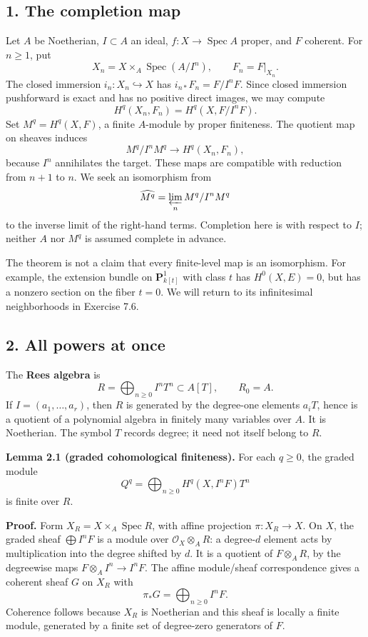 \documentclass[11pt]{article}
\begin{document}
\subsection{1. The completion map}\label{the-completion-map}

Let \(A\) be Noetherian, \(I\subset A\) an ideal,
\(f:X\to\operatorname{Spec}A\) proper, and \(F\) coherent. For
\(n\geq1\), put \[
X_n=X\times_A\operatorname{Spec}(A/I^n),\qquad F_n=F|_{X_n}.
\] The closed immersion \(i_n:X_n\hookrightarrow X\) has
\(i_{n*}F_n=F/I^nF\). Since closed immersion pushforward is exact and
has no positive direct images, we may compute \[
H^q(X_n,F_n)=H^q(X,F/I^nF).
\] Set \(M^q=H^q(X,F)\), a finite \(A\)-module by proper finiteness. The
quotient map on sheaves induces \[
M^q/I^nM^q\longrightarrow H^q(X_n,F_n),
\] because \(I^n\) annihilates the target. These maps are compatible
with reduction from \(n+1\) to \(n\). We seek an isomorphism from \[
\widehat{M^q}=\varprojlim_n M^q/I^nM^q
\] to the inverse limit of the right-hand terms. Completion here is with
respect to \(I\); neither \(A\) nor \(M^q\) is assumed complete in
advance.

The theorem is not a claim that every finite-level map is an
isomorphism. For example, the extension bundle on \(\mathbf P^1_{k[t]}\)
with class \(t\) has \(H^0(X,E)=0\), but has a nonzero section on the
fiber \(t=0\). We will return to its infinitesimal neighborhoods in
Exercise 7.6.

\subsection{2. All powers at once}\label{all-powers-at-once}

The \textbf{Rees algebra} is \[
R=\bigoplus_{n\geq0}I^nT^n\subset A[T],\qquad R_0=A.
\] If \(I=(a_1,\ldots,a_r)\), then \(R\) is generated by the degree-one
elements \(a_iT\), hence is a quotient of a polynomial algebra in
finitely many variables over \(A\). It is Noetherian. The symbol \(T\)
records degree; it need not itself belong to \(R\).

\textbf{Lemma 2.1 (graded cohomological finiteness).} For each
\(q\geq0\), the graded module \[
Q^q=\bigoplus_{n\geq0}H^q(X,I^nF)T^n
\] is finite over \(R\).

\textbf{Proof.} Form \(X_R=X\times_A\operatorname{Spec}R\), with affine
projection \(\pi:X_R\to X\). On \(X\), the graded sheaf
\(\bigoplus I^nF\) is a module over \(\mathcal O_X\otimes_A R\): a
degree-\(d\) element acts by multiplication into the degree shifted by
\(d\). It is a quotient of \(F\otimes_A R\), by the degreewise maps
\(F\otimes_A I^n\to I^nF\). The affine module/sheaf correspondence gives
a coherent sheaf \(G\) on \(X_R\) with \[
\pi_*G=\bigoplus_{n\geq0}I^nF.
\] Coherence follows because \(X_R\) is Noetherian and this sheaf is
locally a finite module, generated by a finite set of degree-zero
generators of \(F\).
\end{document}
